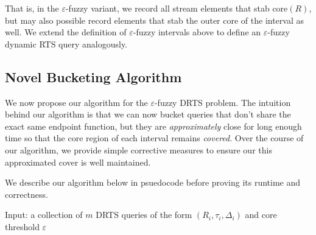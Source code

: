 That is, in the $\varepsilon$-fuzzy variant, we record all stream elements that stab $\text{core}(R)$, but may also possible record elements that stab the outer core of the interval as well. We  extend the definition of $\varepsilon$-fuzzy intervals above to define an $\varepsilon$-fuzzy dynamic RTS query analogously. 

\subsection{Novel Bucketing Algorithm}
We now propose our algorithm for the $\varepsilon$-fuzzy DRTS problem. The intuition behind our algorithm is that we can now bucket queries that don't share the exact same endpoint function, but they are \textit{approximately} close for long enough time so that the core region of each interval remains \textit{covered}. Over the course of our algorithm, we provide simple corrective measures to ensure our this approximated cover is well maintained. 

We describe our algorithm below in psuedocode before proving its runtime and correctness. 


Input: a collection of $m$ DRTS queries of the form $(R_i, \tau_i, \Delta_i)$ and core threshold $\varepsilon$

